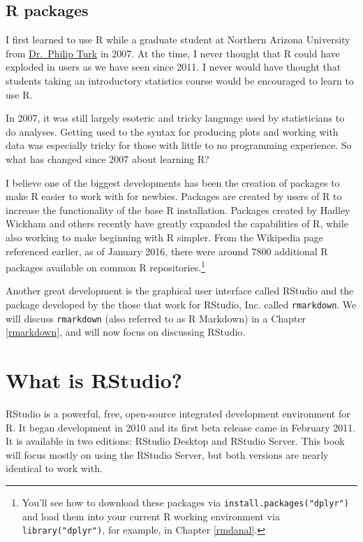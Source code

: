\documentclass[]{tufte-book}
\theoremstyle{definition}
\theoremstyle{definition}
\theoremstyle{remark}
\begin{document}
\subsection{R packages}\label{r-packages}

I first learned to use R while a graduate student at Northern Arizona
University from \href{http://www.stat.colostate.edu/~pturk/}{Dr.~Philip
Turk} in 2007. At the time, I never thought that R could have exploded
in users as we have seen since 2011. I never would have thought that
students taking an introductory statistics course would be encouraged to
learn to use R.

In 2007, it was still largely esoteric and tricky language used by
statisticians to do analyses. Getting used to the syntax for producing
plots and working with data was especially tricky for those with little
to no programming experience. So what has changed since 2007 about
learning R?

I believe one of the biggest developments has been the creation of
packages to make R easier to work with for newbies. Packages are created
by users of R to increase the functionality of the base R installation.
Packages created by Hadley Wickham and others recently have greatly
expanded the capabilities of R, while also working to make beginning
with R simpler. From the Wikipedia page referenced earlier, as of
January 2016, there were around 7800 additional R packages available on
common R repositories.\footnote{You'll see how to download these
  packages via \texttt{install.packages("dplyr")} and load them into
  your current R working environment via \texttt{library("dplyr")}, for
  example, in Chapter \ref{rmdanal}.}

Another great development is the graphical user interface called RStudio
and the package developed by the those that work for RStudio, Inc.
called \texttt{rmarkdown}. We will discuss \texttt{rmarkdown} (also
referred to as R Markdown) in a Chapter \ref{rmarkdown}, and will now
focus on discussing RStudio.

\section{What is RStudio?}\label{what-is-rstudio}

RStudio is a powerful, free, open-source integrated development
environment for R. It began development in 2010 and its first beta
release came in February 2011. It is available in two editions: RStudio
Desktop and RStudio Server. This book will focus mostly on using the
RStudio Server, but both versions are nearly identical to work with.
\end{document}
